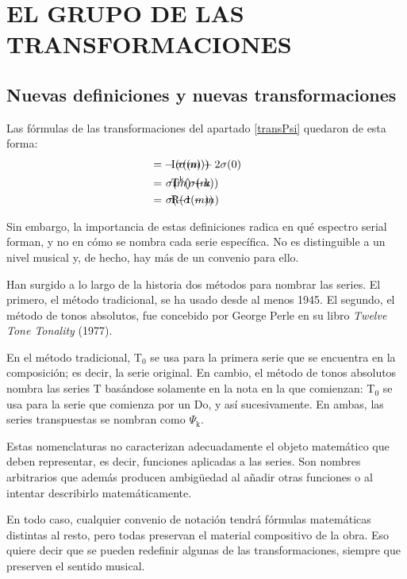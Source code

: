 \chapter{EL GRUPO DE LAS TRANSFORMACIONES}
	\section{Nuevas definiciones y nuevas transformaciones}
		\label{ciclico} 
		Las fórmulas de las transformaciones del apartado \ref{transPsi} quedaron de esta forma:
		\begin{align*}		
		&\text{I}(\sigma(m))\hspace*{-2.4cm}&=& -\sigma(m) + 2\sigma(0)\\
		&\text{T}^\text{k}(\sigma(m))\hspace*{-2.4cm}&=&\ \sigma(m) + \text{k}\\
		&\text{R}(\sigma(m))\hspace*{-2.4cm}&=&\ \sigma(-1-m)
		\end{align*}
			
		Sin embargo, la importancia de estas definiciones radica en qué espectro serial forman, y no en cómo se nombra cada serie específica. No es distinguible a un nivel musical y, de hecho, hay más de un convenio para ello.
		
		Han surgido a lo largo de la historia dos métodos para nombrar las series. El primero, el método tradicional, se ha usado desde al menos 1945. El segundo, el método de tonos absolutos, fue concebido por George Perle en su libro \emph{Twelve Tone Tonality} (1977).
		
		En el método tradicional, T$_0$ se usa para la primera serie que se encuentra en la composición; es decir, la serie original. En cambio, el método de tonos absolutos nombra las series T basándose solamente en la nota en la que comienzan: T$_0$ se usa para la serie que comienza por un Do, y así sucesivamente. En ambas, las series transpuestas se nombran como $\Psi_\text{k}$.
		
		Estas nomenclaturas no caracterizan adecuadamente el objeto matemático que deben representar, es decir, funciones aplicadas a las series. Son nombres arbitrarios que además producen ambigüedad al añadir otras funciones o al intentar describirlo matemáticamente.
		
		En todo caso, cualquier convenio de notación tendrá fórmulas matemáticas distintas al resto, pero todas preservan el material compositivo de la obra. Eso quiere decir que se pueden redefinir algunas de las transformaciones, siempre que preserven el sentido musical. 
		
